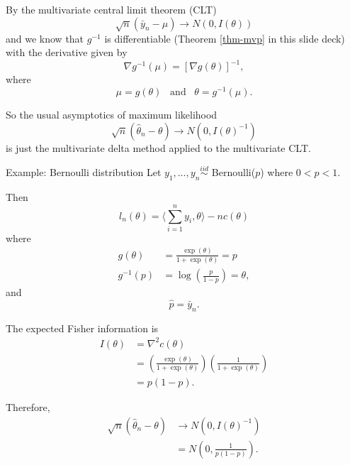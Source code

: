 \documentclass[
  ignorenonframetext,
]{beamer}
\begin{document}
\begin{frame}{}
\protect\hypertarget{section-4}{}
By the multivariate central limit theorem (CLT) \[
  \sqrt{n}\left(\bar y_n - \mu\right) \to N\left(0, I(\theta)\right)
\] and we know that \(g^{-1}\) is differentiable (Theorem \ref{thm-mvp}
in this slide deck) with the derivative given by \[
  \nabla g^{-1}(\mu) = \left[\nabla g(\theta)\right]^{-1},
\] where \[
  \mu = g(\theta) \;\;\; \text{and} \;\;\; \theta = g^{-1}(\mu).
\]
\end{frame}

\begin{frame}{}
\protect\hypertarget{section-5}{}
So the usual asymptotics of maximum likelihood
\begin{equation} \label{asymptoticsMLE}
    \sqrt{n}\left(\hat\theta_n - \theta\right) \to N\left(0, I(\theta)^{-1}\right)
\end{equation} is just the multivariate delta method applied to the
multivariate CLT.
\end{frame}

\begin{frame}{Example: Bernoulli distribution}
\protect\hypertarget{example-bernoulli-distribution}{}
Let \(y_1,\ldots,y_n \overset{iid}{\sim}\) Bernoulli(\(p\)) where
\(0 < p < 1\).

Then \[
  l_n(\theta) = \langle\sum_{i=1}^n y_i,\theta\rangle - n c(\theta)
\] where \begin{align*}
  g(\theta) &= \frac{\exp(\theta)}{1 + \exp(\theta)} = p \\
  g^{-1}(p) &= \log\left(\frac{p}{1-p}\right) = \theta,
\end{align*} and \[
  \hat{p} = \bar{y}_n.
\]
\end{frame}

\begin{frame}{}
\protect\hypertarget{section-6}{}
The expected Fisher information is \begin{align*}
  I(\theta) &= \nabla^2 c(\theta) \\
    &= \left(\frac{\exp(\theta)}{1 + \exp(\theta)}\right)\left(\frac{1}{1 + \exp(\theta)}\right) \\
    &= p(1-p).
\end{align*}

Therefore, \begin{align*}
 \sqrt{n}\left(\hat{\theta}_n - \theta\right) &\to N\left(0,  I(\theta)^{-1}\right) \\
   &= N\left(0,  \frac{1}{p(1-p)}\right).
\end{align*}
\end{frame}
\end{document}
